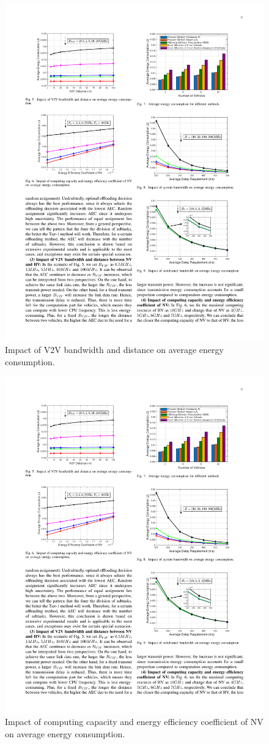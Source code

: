 \documentclass[lettersize,journal]{IEEEtran}
\begin{document}
\begin{figure}[!t]
\centering
\includegraphics[width=2.8 in]{Figures/Tier_1_E3}
\caption{Impact of V2V bandwidth and distance on average energy consumption.}
\label{fig_5}
\end{figure}

\begin{figure}[!t]
\centering
\includegraphics[width=2.8 in]{Figures/Tier_1_E4}
\caption{Impact of computing capacity and energy efficiency coefficient of NV on average energy consumption.}
\label{fig_6}
\end{figure}
\end{document}
